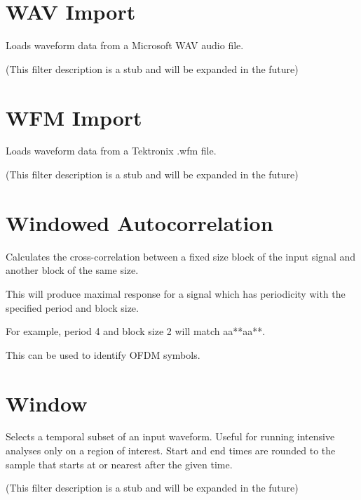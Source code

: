 \pagebreak
\section{WAV Import}

Loads waveform data from a Microsoft WAV audio file.

(This filter description is a stub and will be expanded in the future)

\pagebreak
\section{WFM Import}

Loads waveform data from a Tektronix .wfm file.

(This filter description is a stub and will be expanded in the future)

\pagebreak
\section{Windowed Autocorrelation}

Calculates the cross-correlation between a fixed size block of the input signal and another block of the same size.

This will produce maximal response for a signal which has periodicity with the specified period and block size.

For example, period 4 and block size 2 will match aa**aa**.

This can be used to identify OFDM symbols.

\pagebreak
\section{Window}

Selects a temporal subset of an input waveform. Useful for running intensive analyses only on a region of interest.
Start and end times are rounded to the sample that starts at or nearest after the given time.

(This filter description is a stub and will be expanded in the future)

